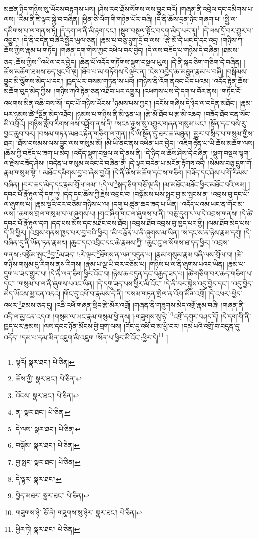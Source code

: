 མཚན་ཉིད་གཉིས་སུ་ཡོངས་བརྟགས་པས། །ཤེས་རབ་ཐོས་སོགས་ལས་བྱུང་བའོ། །གཞན་ནི་འབྲེལ་དང་དམིགས་པ་ལས། །རིམ་ནི་ཇི་ལྟར་སྐྱེ་བ་བཞིན། །ཕྱིན་ཅི་ལོག་གི་གཉེན་པོར་བཞི། །དེ་ནི་ཆོས་དྲན་ཉེར་གཞག་པ། །སྤྱི་ལ་དམིགས་པ་ལ་གནས་ཏེ། །དེ་དག་ལ་ནི་མི་རྟག་དང་། །སྡུག་བསྔལ་སྟོང་བདག་མེད་པར་ལྟ།\footnote{ལྟའོ།  སྣར་ཐང་།  པེ་ཅིན། } །དེ་ལས་དྲོ་བར་གྱུར་པ་འབྱུང་། །དེ་ནི་བདེན་བཞིའི་སྤྱོད་ཡུལ་ཅན། །རྣམ་པ་བཅུ་དྲུག་དྲོ་བ་ལས། །རྩེ་མོ་དེ་ཡང་དེ་དང་འདྲ། །གཉིས་ཀ་ཆོས་ཀྱིས་རྣམ་པ་གཏོད། །གཞན་དག་གིས་ཀྱང་འཕེལ་བར་བྱེད། །དེ་ལས་བཟོད་པ་གཉིས་དེ་བཞིན། །ཐམས་ཅད་:ཆོས་ཀྱིས་\footnote{ཆོས་ཀྱི་  སྣར་ཐང་།  པེ་ཅིན། }འཕེལ་བར་བྱེད། །ཆེན་པོ་འདོད་གཏོགས་སྡུག་བསྔལ་ཡུལ། །དེ་ནི་སྐད་ཅིག་གཅིག་དེ་བཞིན། །ཆོས་མཆོག་ཐམས་ཅད་ཕུང་པོ་ལྔ། །ཐོབ་པ་མ་གཏོགས་དེ་ལྟར་ན། །ངེས་འབྱེད་ཆ་མཐུན་རྣམ་པ་བཞི། །བསྒོམས་བྱུང་མི་ལྕོགས་མེད་པ་དང་། །ཁྱད་པར་བསམ་གཏན་ས་པའོ། །གཉིས་ནི་འོག་ནའང་ཡོད་པའམ། །འདོད་རྟེན་ཆོས་མཆོག་བུད་མེད་ཀྱིས། །གཉིས་ཀའི་རྟེན་ཅན་འཐོབ་པར་འགྱུར། །འཕགས་པས་དེ་དག་ས་བོར་ནས། །གཏོང་ངོ་འཕགས་མིན་འཆི་བས་སོ། །དང་པོ་གཉིས་ཡོངས་\footnote{འོངས་  སྣར་ཐང་།  པེ་ཅིན། }ཉམས་པས་ཀྱང་། །དངོས་གཞིས་དེ་ཉིད་ལ་བདེན་མཐོང་། །རྣམ་པར་ཉམས་ཚེ་\footnote{ན་  སྣར་ཐང་།  པེ་ཅིན། }སྔོན་མེད་འཐོབ། །ཉམས་པ་གཉིས་ནི་མི་ལྡན་པ། །རྩེ་མོ་ཐོབ་པ་རྩ་མི་འཆད། །བཟོད་ཐོབ་ངན་སོང་མི་འགྲོའོ། །གཉིས་སློབ་རིགས་ལས་བཟློག་ནས་ནི། །སངས་རྒྱས་སུ་འགྱུར་གཞན་གསུམ་ཡང་། །སྟོན་དང་བསེ་རུ་བྱང་ཆུབ་བར། །བསམ་གཏན་མཐའ་རྟེན་གཅིག་ལ་ཀུན། །དེ་ཡི་སྔོན་དུ་ཐར་ཆ་མཐུན། །མྱུར་བ་སྲིད་པ་གསུམ་གྱིས་ཐར། །ཐོས་བསམས་ལས་བྱུང་ལས་གསུམ་མོ། །མི་ཡི་ནང་ནས་འཕེན་པར་བྱེད། །འཇིག་རྟེན་པ་ཡི་ཆོས་མཆོག་ལས། །ཆོས་ཀྱི་བཟོད་པ་ཟག་པ་མེད། །འདོད་སྡུག་བསྔལ་ལ་དེ་ནས་ནི། །དེ་ཉིད་ལ་ཆོས་ཤེས་དེ་བཞིན། །སྡུག་བསྔལ་ལྷག་ལ་རྗེས་བཟོད་ཤེས། །བདེན་པ་གསུམ་ལའང་དེ་བཞིན་ནོ། །དེ་ལྟར་བདེན་པ་མངོན་རྟོགས་འདི། །སེམས་བཅུ་དྲུག་གོ་རྣམ་གསུམ་སྟེ། །
མཐོང་དམིགས་བྱ་བ་ཞེས་བྱའོ། །དེ་ནི་ཆོས་མཆོག་དང་ས་གཅིག །བཟོད་དང་ཤེས་པ་གོ་རིམས་བཞིན། །བར་ཆད་མེད་དང་རྣམ་གྲོལ་ལམ། །:དེ་ལ་\footnote{དེ་ལས་  སྣར་ཐང་།  པེ་ཅིན། }སྐད་ཅིག་བཅོ་ལྔ་ནི། །མ་མཐོང་མཐོང་ཕྱིར་མཐོང་བའི་ལམ། །དབང་པོ་རྣོ་རྟུལ་དེ་དག་ཏུ། །དད་དང་ཆོས་ཀྱི་རྗེས་འབྲང་བ། །བསྒོམས་པས་སྤང་བྱ་མ་སྤངས་ན། །འབྲས་བུ་དང་པོ་ལ་ཞུགས་པ། །རྣམ་ལྔའི་བར་བཅོམ་གཉིས་པ་ལ། །དགུ་པ་ཚུན་ཆད་ཟད་པ་ཡིན། །འདོད་པའམ་ཡང་ན་གོང་མ་ལས། །ཆགས་བྲལ་གསུམ་པ་ལ་ཞུགས་པ། །གང་ཞིག་གང་ལ་ཞུགས་པ་ནི། །བཅུ་དྲུག་པ་ལ་དེ་འབྲས་གནས། །དེ་ཚེ་དབང་པོ་རྣོ་རྟུལ་དག །དད་པས་མོས་དང་མཐོང་བས་ཐོབ། །འབྲས་ཐོབ་འབྲས་བུ་ཁྱད་པར་གྱི། །ལམ་ཐོབ་མེད་པས་དེ་ཡི་ཕྱིར། །འབྲས་གནས་ཁྱད་པར་བྱ་བའི་ཕྱིར། །མི་བརྩོན་པ་ནི་ཞུགས་མ་ཡིན། །ས་དང་ས་ན་ཉེས་རྣམ་དགུ། །དེ་བཞིན་དུ་ནི་ཡོན་ཏན་རྣམས། །ཆུང་དང་འབྲིང་དང་ཆེ་རྣམས་ཀྱི། །ཆུང་ངུ་ལ་སོགས་ཐ་དད་ཕྱིར། །འབྲས་གནས་:བསྒོམ་སྤང་\footnote{བསྒོམ་  སྣར་ཐང་།  པེ་ཅིན། }བྱ་\footnote{བྱ་སྤང་  སྣར་ཐང་།  པེ་ཅིན། }མ་ཟད། །:རེ་ལྟར་\footnote{དེ་ལྟར་  སྣར་ཐང་། }ཐོགས་ན་ལན་བདུན་པ། །རྣམ་གསུམ་རྣམ་བཞི་ལས་གྲོལ་བ། །ཚེ་གཉིས་གསུམ་དུ་རིགས་ནས་རིགས། །རྣམ་པ་ལྔ་ཡི་བར་བཅོམ་པ། །གཉིས་པ་ལ་ནི་ཞུགས་པའང་ཡིན། །རྣམ་པ་དྲུག་པ་ཟད་གྱུར་པ། །དེ་ནི་ལན་ཅིག་ཕྱིར་འོང་བ། །ཉེས་ཆ་བདུན་དང་བརྒྱད་ཟད་པ། །ཚེ་གཅིག་བར་ཆད་གཅིག་པ་དང་། །གསུམ་པ་ལ་ནི་ཞུགས་པའང་ཡིན། །དེ་དགུ་ཟད་པས་ཕྱིར་མི་འོང་། །དེ་ནི་བར་སྐྱེས་འདུ་བྱེད་དང་། །འདུ་བྱེད་མེད་ཡོངས་མྱ་ངན་འདའ། །གོང་དུ་འཕོ་བ་རྣམས་དེ་ནི། །བསམ་གཏན་སྤེལ་ན་འོག་མིན་འགྲོ། །དེ་འཕར་:ཕྱེད་འཕར་\footnote{བྱེད་མཐར་  སྣར་ཐང་།  པེ་ཅིན། }ཐམས་ཅད་དུ། །འཆི་འཕོ་གཞན་སྲིད་རྩེ་མོར་འགྲོ། །གཞན་ནི་གཟུགས་མེད་འགྲོ་རྣམ་བཞི། །གཞན་ནི་འདི་ལ་མྱ་ངན་འདའ། །གསུམ་ལ་ཡང་རྣམ་གསུམ་ཕྱེ་ནས། །:གཟུགས་སུ་ཉེ་\footnote{གཟུགས་ཉེ་  ཅོ་ནེ། གཟུགས་སུ་ཉེར་  སྣར་ཐང་།  པེ་ཅིན། }འགྲོ་དགུར་བཤད་དོ། །དེ་དག་གི་ནི་ཁྱད་པར་རྣམས། །ལས་དབང་ཉོན་མོངས་བྱེ་བྲག་ལས། །གོང་དུ་འཕོ་བ་མ་ཕྱེ་བར། །དམ་པའི་འགྲོ་བ་བདུན་དུ་འདོད། །དམ་པ་དམ་མིན་འཇུག་མི་འཇུག །སོན་པ་ཕྱིར་མི་འོང་:ཕྱིར་དེ།\footnote{ཕྱིར་ཏེ།  སྣར་ཐང་།  པེ་ཅིན། } །
